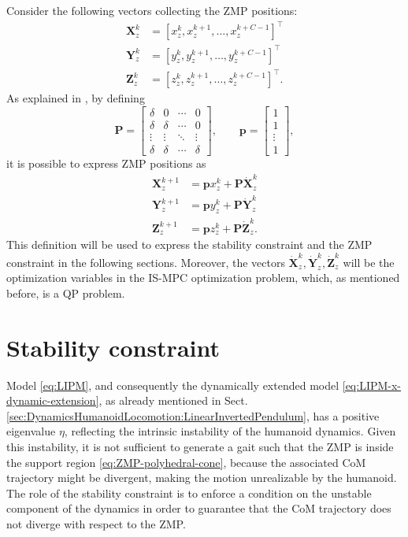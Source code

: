 Consider the following vectors collecting the ZMP positions:
\begin{align}
    \label{eq:ZMP-positions-x-matrix}
    \bm{X}_z^k &= \left[x_z^k, x_z^{k+1}, \dots, x_z^{k+C-1}\right]^\top \\
    \bm{Y}_z^k &= \left[y_z^k, y_z^{k+1}, \dots, y_z^{k+C-1}\right]^\top \\
    \bm{Z}_z^k &= \left[z_z^k, z_z^{k+1}, \dots, z_z^{k+C-1}\right]^\top.
\end{align}
As explained in \cite{Scianca2016ISMPC}, by defining
\begin{equation*}
    \bm{P} =
    \begin{bmatrix}
        \delta & 0 & \cdots & 0 \\
        \delta & \delta & \cdots & 0 \\
        \vdots & \vdots & \ddots & \vdots \\
        \delta & \delta & \cdots & \delta
    \end{bmatrix},
    \qquad
    \bm{p} =
    \begin{bmatrix}
        1 \\ 1 \\ \vdots \\ 1
    \end{bmatrix},
\end{equation*}
it is possible to express ZMP positions as
\begin{align*}
    \bm{X}_z^{k+1} &= \bm{p} x_z^k + \bm{P} \dot{\bm{X}}_z^k \\
    \bm{Y}_z^{k+1} &= \bm{p} y_z^k + \bm{P} \dot{\bm{Y}}_z^k \\
    \bm{Z}_z^{k+1} &= \bm{p} z_z^k + \bm{P} \dot{\bm{Z}}_z^k.
\end{align*}
This definition will be used to express the stability constraint and the
ZMP constraint in the following sections. Moreover, the vectors $\dot{\bm{X}}_z^k,
\dot{\bm{Y}}_z^k, \dot{\bm{Z}}_z^k$ will be the optimization variables in the 
IS-MPC optimization problem, which, as mentioned before, is a QP problem.

\section{Stability constraint}
Model \eqref{eq:LIPM}, and consequently the dynamically extended model
\eqref{eq:LIPM-x-dynamic-extension}, as already mentioned in Sect.
\ref{sec:DynamicsHumanoidLocomotion:LinearInvertedPendulum}, has a positive
eigenvalue $\eta$, reflecting the intrinsic instability of the humanoid dynamics.
Given this instability, it is not sufficient to generate a gait such that
the ZMP is inside the support region \eqref{eq:ZMP-polyhedral-cone},
because the associated CoM trajectory might be divergent,
making the motion unrealizable by the humanoid.
The role of the stability constraint is to enforce a condition on the
unstable component of the dynamics in order to guarantee that the CoM
trajectory does not diverge with respect to the ZMP.

